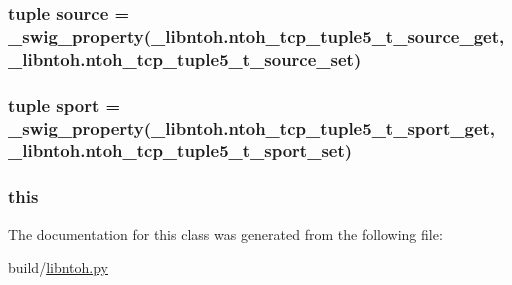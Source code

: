 \hypertarget{classlibntoh_1_1ntoh__tcp__tuple5__t_aa873026052cc3e5ba03877243fcb7ecd}{
\subsubsection[{source}]{\setlength{\rightskip}{0pt plus 5cm}tuple source = {\bf \-\_\-swig\-\_\-property}(\-\_\-libntoh.\-ntoh\-\_\-tcp\-\_\-tuple5\-\_\-t\-\_\-source\-\_\-get, \-\_\-libntoh.\-ntoh\-\_\-tcp\-\_\-tuple5\-\_\-t\-\_\-source\-\_\-set)\hspace{0.3cm}{\ttfamily [static]}}}\label{classlibntoh_1_1ntoh__tcp__tuple5__t_aa873026052cc3e5ba03877243fcb7ecd}
\hypertarget{classlibntoh_1_1ntoh__tcp__tuple5__t_a2833ef95f75538c4db32557cebba6eeb}{
\subsubsection[{sport}]{\setlength{\rightskip}{0pt plus 5cm}tuple sport = {\bf \-\_\-swig\-\_\-property}(\-\_\-libntoh.\-ntoh\-\_\-tcp\-\_\-tuple5\-\_\-t\-\_\-sport\-\_\-get, \-\_\-libntoh.\-ntoh\-\_\-tcp\-\_\-tuple5\-\_\-t\-\_\-sport\-\_\-set)\hspace{0.3cm}{\ttfamily [static]}}}\label{classlibntoh_1_1ntoh__tcp__tuple5__t_a2833ef95f75538c4db32557cebba6eeb}
\hypertarget{classlibntoh_1_1ntoh__tcp__tuple5__t_a05c09a5e9d53fa7adf0a7936038c2fa3}{
\subsubsection[{this}]{\setlength{\rightskip}{0pt plus 5cm}this}}\label{classlibntoh_1_1ntoh__tcp__tuple5__t_a05c09a5e9d53fa7adf0a7936038c2fa3}


The documentation for this class was generated from the following file\-:\begin{DoxyCompactItemize}
\item 
build/\hyperlink{libntoh_8py}{libntoh.\-py}\end{DoxyCompactItemize}
